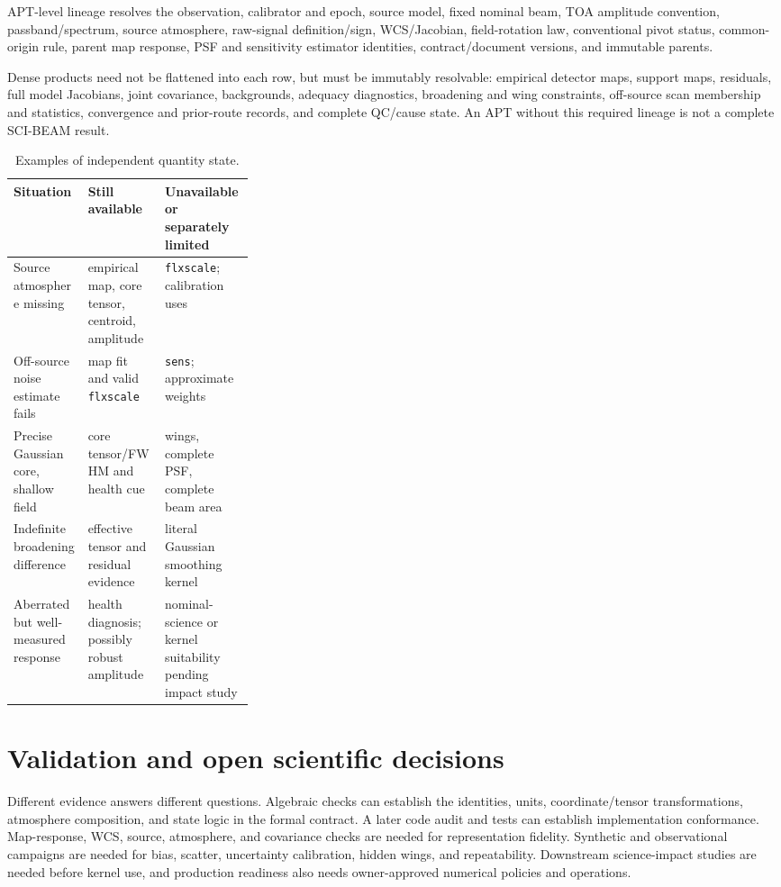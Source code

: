 \documentclass[11pt]{article}
\begin{document}
APT-level lineage resolves the observation, calibrator and epoch, source
model, fixed nominal beam, TOA amplitude convention, passband/spectrum, source
atmosphere, raw-signal definition/sign, WCS/Jacobian, field-rotation law,
conventional pivot status, common-origin rule, parent map response, PSF and
sensitivity estimator identities, contract/document versions, and immutable
parents.

Dense products need not be flattened into each row, but must be immutably
resolvable: empirical detector maps, support maps, residuals, full model
Jacobians, joint covariance, backgrounds, adequacy diagnostics, broadening and
wing constraints, off-source scan membership and statistics, convergence and
prior-route records, and complete QC/cause state. An APT without this required
lineage is not a complete SCI-BEAM result.

\begin{table}[ht]\centering\small
\caption{Examples of independent quantity state.}\label{tab:states}
\begin{tabularx}{\linewidth}{@{}L{0.31\linewidth}YY@{}}
\toprule Situation & Still available & Unavailable or separately limited \\
\midrule
Source atmosphere missing & empirical map, core tensor, centroid, amplitude & \texttt{flxscale}; calibration uses \\
Off-source noise estimate fails & map fit and valid \texttt{flxscale} & \texttt{sens}; approximate weights \\
Precise Gaussian core, shallow field & core tensor/FWHM and health cue & wings, complete PSF, complete beam area \\
Indefinite broadening difference & effective tensor and residual evidence & literal Gaussian smoothing kernel \\
Aberrated but well-measured response & health diagnosis; possibly robust amplitude & nominal-science or kernel suitability pending impact study \\
\bottomrule
\end{tabularx}
\end{table}

\section{Validation and open scientific decisions}
\label{sec:validation}

Different evidence answers different questions. Algebraic checks can establish
the identities, units, coordinate/tensor transformations, atmosphere
composition, and state logic in the formal contract. A later code audit and
tests can establish implementation conformance. Map-response, WCS, source,
atmosphere, and covariance checks are needed for representation fidelity.
Synthetic and observational campaigns are needed for bias, scatter,
uncertainty calibration, hidden wings, and repeatability. Downstream
science-impact studies are needed before kernel use, and production readiness
also needs owner-approved numerical policies and operations.
\end{document}

